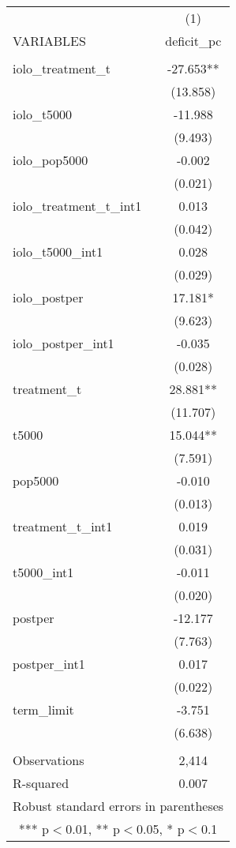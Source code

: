 \documentclass[]{article}
\begin{document}
\begin{tabular}{lc} \hline
 & (1) \\
VARIABLES & deficit\_pc \\ \hline
 &  \\
iolo\_treatment\_t & -27.653** \\
 & (13.858) \\
iolo\_t5000 & -11.988 \\
 & (9.493) \\
iolo\_pop5000 & -0.002 \\
 & (0.021) \\
iolo\_treatment\_t\_int1 & 0.013 \\
 & (0.042) \\
iolo\_t5000\_int1 & 0.028 \\
 & (0.029) \\
iolo\_postper & 17.181* \\
 & (9.623) \\
iolo\_postper\_int1 & -0.035 \\
 & (0.028) \\
treatment\_t & 28.881** \\
 & (11.707) \\
t5000 & 15.044** \\
 & (7.591) \\
pop5000 & -0.010 \\
 & (0.013) \\
treatment\_t\_int1 & 0.019 \\
 & (0.031) \\
t5000\_int1 & -0.011 \\
 & (0.020) \\
postper & -12.177 \\
 & (7.763) \\
postper\_int1 & 0.017 \\
 & (0.022) \\
term\_limit & -3.751 \\
 & (6.638) \\
 &  \\
Observations & 2,414 \\
 R-squared & 0.007 \\ \hline
\multicolumn{2}{c}{ Robust standard errors in parentheses} \\
\multicolumn{2}{c}{ *** p$<$0.01, ** p$<$0.05, * p$<$0.1} \\
\end{tabular}
\end{document}
